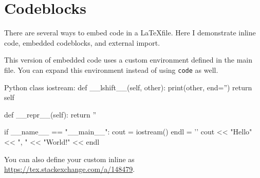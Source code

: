 \section{Codeblocks}
There are several ways to embed code in a \LaTeX file.
Here I demonstrate inline code, embedded codeblocks, and external import.

This version of embedded code uses a custom environment defined in the main file.
You can expand this environment instead of using \texttt{code} as well.

\begin{code}{Python}
  class iostream:
      def __lshift__(self, other):
          print(other, end='')
          return self

      def __repr__(self):
          return ''


  if __name__ == "__main__":
      cout = iostream()
      endl = '\n'
      cout << "Hello" << ", " << "World!" << endl
\end{code}


You can also define your custom inline as \url{https://tex.stackexchange.com/a/148479}.
